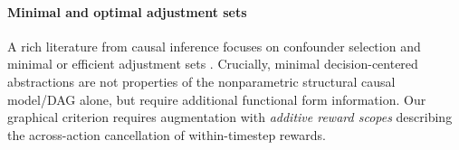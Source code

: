 \documentclass[opre,nonblindrev]{informs4}
\begin{document}
\paragraph{Minimal and optimal adjustment sets }
A rich literature from causal inference focuses on confounder selection and minimal or efficient adjustment sets \citep{witte2020efficient}. Crucially, minimal decision-centered abstractions are not properties of the nonparametric structural causal model/DAG alone, but require additional functional form information. Our graphical criterion requires augmentation with \textit{additive reward scopes} describing the across-action cancellation of within-timestep rewards. 
    
 
\end{document}
